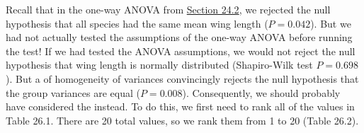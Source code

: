 \documentclass[
  openany]{krantz}
\begin{document}
Recall that in the one-way ANOVA from \protect\hyperlink{one-way-anova}{Section 24.2}, we rejected the null hypothesis that all species had the same mean wing length (\(P = 0.042\)).
But we had not actually tested the assumptions of the one-way ANOVA before running the test!
If we had tested the ANOVA assumptions, we would not reject the null hypothesis that wing length is normally distributed (Shapiro-Wilk test \(P = 0.698\)).
But a  of homogeneity of variances convincingly rejects the null hypothesis that the group variances are equal (\(P = 0.008\)).
Consequently, we should probably have considered the   instead.
To do this, we first need to rank all of the values in Table 26.1.
There are 20 total values, so we rank them from 1 to 20 (Table 26.2).
\end{document}
